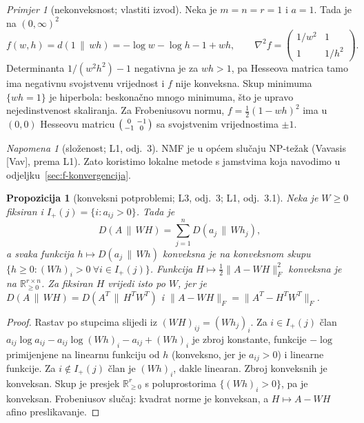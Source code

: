 \documentclass[11pt,a4paper]{article}
\theoremstyle{definition}
\theoremstyle{plain}
\newtheorem{propozicija}[definicija]{Propozicija}
\theoremstyle{remark}
\newtheorem{napomena}[definicija]{Napomena}
\newtheorem{primjer}[definicija]{Primjer}
\newcommand{\Rp}{\mathbb{R}_{\geq 0}}
\newcommand{\Dkl}[2]{D(#1\,\|\,#2)}
\newcommand{\dkl}[2]{d(#1\,\|\,#2)}
\begin{document}
\begin{primjer}[nekonveksnost; vlastiti izvod]\label{pr:nekonveksnost}
Neka je $m=n=r=1$ i $a=1$. Tada je na $(0,\infty)^2$
\[
  f(w,h)=\dkl{1}{wh}=-\log w-\log h-1+wh,\qquad
  \nabla^2 f=\begin{pmatrix}1/w^2&1\\1&1/h^2\end{pmatrix}.
\]
Determinanta $1/(w^2h^2)-1$ negativna je za $wh>1$, pa Hesseova matrica tamo ima negativnu
svojstvenu vrijednost i $f$ nije konveksna. Skup minimuma $\{wh=1\}$ je hiperbola: beskonačno mnogo
minimuma, što je upravo nejedinstvenost skaliranja. Za Frobeniusovu normu, $f=\frac12(1-wh)^2$ ima
u $(0,0)$ Hesseovu matricu $\begin{psmallmatrix}0&-1\\-1&0\end{psmallmatrix}$ sa svojstvenim
vrijednostima $\pm1$.
\end{primjer}

\begin{napomena}[složenost; L1, odj.~3]
NMF je u općem slučaju NP-težak (Vavasis [Vav], prema L1). Zato koristimo lokalne metode s
jamstvima koja navodimo u odjeljku~\ref{sec:f-konvergencija}.
\end{napomena}

\begin{propozicija}[konveksni potproblemi; L3, odj.~3; L1, odj.~3.1]\label{prop:konveksnost}
Neka je $W\geq0$ fiksiran i $I_+(j)=\{i:a_{ij}>0\}$. Tada je
\[
  \Dkl{A}{WH}=\sum_{j=1}^n\Dkl{a_j}{Wh_j},
\]
a svaka funkcija $h\mapsto\Dkl{a_j}{Wh}$ konveksna je na konveksnom skupu
$\{h\geq0:(Wh)_i>0\ \forall i\in I_+(j)\}$. Funkcija $H\mapsto\frac12\|A-WH\|_F^2$ konveksna je na
$\Rp^{r\times n}$. Za fiksiran $H$ vrijedi isto po $W$, jer je $\Dkl{A}{WH}=\Dkl{A^T}{H^TW^T}$ i
$\|A-WH\|_F=\|A^T-H^TW^T\|_F$.
\end{propozicija}
\begin{proof}
Rastav po stupcima slijedi iz $(WH)_{ij}=(Wh_j)_i$. Za $i\in I_+(j)$ član
$a_{ij}\log a_{ij}-a_{ij}\log(Wh)_i-a_{ij}+(Wh)_i$ je zbroj konstante, funkcije $-\log$ primijenjene
na linearnu funkciju od $h$ (konveksno, jer je $a_{ij}>0$) i linearne funkcije. Za $i\notin I_+(j)$
član je $(Wh)_i$, dakle linearan. Zbroj konveksnih je konveksan. Skup je presjek $\Rp^r$ s
poluprostorima $\{(Wh)_i>0\}$, pa je konveksan. Frobeniusov slučaj: kvadrat norme je konveksan, a
$H\mapsto A-WH$ afino preslikavanje.
\end{proof}
\end{document}
